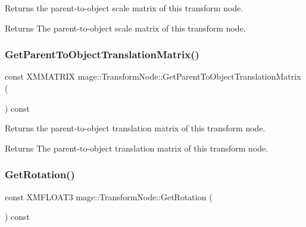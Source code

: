 Returns the parent-\/to-\/object scale matrix of this transform node.

\begin{DoxyReturn}{Returns}
The parent-\/to-\/object scale matrix of this transform node. 
\end{DoxyReturn}
\hypertarget{structmage_1_1_transform_node_a11feea92825b1b537940cd8105edd801}{}\label{structmage_1_1_transform_node_a11feea92825b1b537940cd8105edd801} 
\subsubsection{\texorpdfstring{Get\+Parent\+To\+Object\+Translation\+Matrix()}{GetParentToObjectTranslationMatrix()}}
{\footnotesize\ttfamily const X\+M\+M\+A\+T\+R\+IX mage\+::\+Transform\+Node\+::\+Get\+Parent\+To\+Object\+Translation\+Matrix (\begin{DoxyParamCaption}{ }\end{DoxyParamCaption}) const\hspace{0.3cm}{\ttfamily [noexcept]}}

Returns the parent-\/to-\/object translation matrix of this transform node.

\begin{DoxyReturn}{Returns}
The parent-\/to-\/object translation matrix of this transform node. 
\end{DoxyReturn}
\hypertarget{structmage_1_1_transform_node_ae785911d718434387199a92c6966a9b7}{}\label{structmage_1_1_transform_node_ae785911d718434387199a92c6966a9b7} 
\subsubsection{\texorpdfstring{Get\+Rotation()}{GetRotation()}}
{\footnotesize\ttfamily const X\+M\+F\+L\+O\+A\+T3 mage\+::\+Transform\+Node\+::\+Get\+Rotation (\begin{DoxyParamCaption}{ }\end{DoxyParamCaption}) const\hspace{0.3cm}{\ttfamily [noexcept]}}

